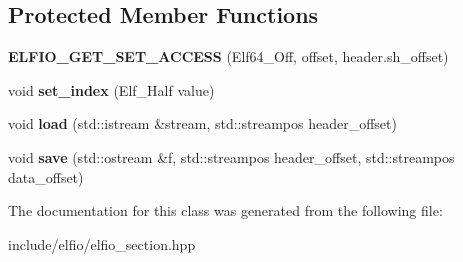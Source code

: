 \subsection*{Protected Member Functions}
\begin{DoxyCompactItemize}
\item 
{\bfseries E\+L\+F\+I\+O\+\_\+\+G\+E\+T\+\_\+\+S\+E\+T\+\_\+\+A\+C\+C\+E\+SS} (Elf64\+\_\+\+Off, offset, header.\+sh\+\_\+offset)\hypertarget{class_e_l_f_i_o_1_1section__impl_a5c132fbe796140543993de674b3b6c09}{}\label{class_e_l_f_i_o_1_1section__impl_a5c132fbe796140543993de674b3b6c09}

\item 
void {\bfseries set\+\_\+index} (Elf\+\_\+\+Half value)\hypertarget{class_e_l_f_i_o_1_1section__impl_a98086ed100f3a992d6d3043576e0393e}{}\label{class_e_l_f_i_o_1_1section__impl_a98086ed100f3a992d6d3043576e0393e}

\item 
void {\bfseries load} (std\+::istream \&stream, std\+::streampos header\+\_\+offset)\hypertarget{class_e_l_f_i_o_1_1section__impl_a3912ad8890f63cc7e5188cc17667d247}{}\label{class_e_l_f_i_o_1_1section__impl_a3912ad8890f63cc7e5188cc17667d247}

\item 
void {\bfseries save} (std\+::ostream \&f, std\+::streampos header\+\_\+offset, std\+::streampos data\+\_\+offset)\hypertarget{class_e_l_f_i_o_1_1section__impl_a71ee2417025797b492d46068c761ab77}{}\label{class_e_l_f_i_o_1_1section__impl_a71ee2417025797b492d46068c761ab77}

\end{DoxyCompactItemize}


The documentation for this class was generated from the following file\+:\begin{DoxyCompactItemize}
\item 
include/elfio/elfio\+\_\+section.\+hpp\end{DoxyCompactItemize}
